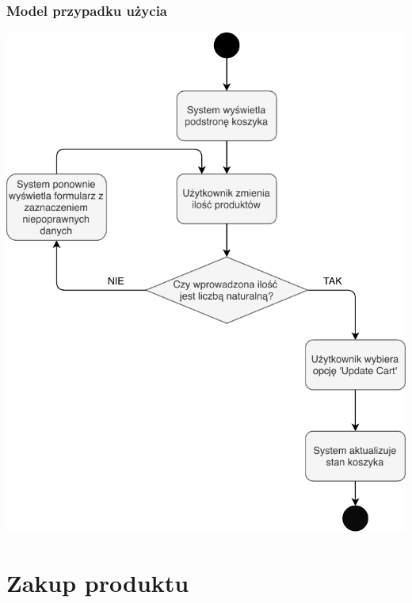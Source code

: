 \documentclass[12pt]{report}
\begin{document}
\subsubsection{Model przypadku użycia}
\begin{center}
	\includegraphics[width=400pt]{koszyk2.pdf}
\end{center}
	
	\section{Zakup produktu}
	
\end{document}

